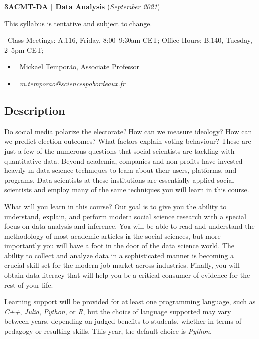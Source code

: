 \documentclass{article}
\begin{document}
\begin{center}
    {\Large\textbf{3ACMT-DA | Data Analysis} (\textit{September 2021})}

This syllabus is tentative and subject to change.

{\small
    \faClock~Class Meetings: A.116, Friday, 8:00--9:30am CET; Office Hours: B.140, Tuesday, 2--5pm CET;
}

\end{center}

\begin{itemize}
    \item \faUser~Mickael Temporão, Associate Professor
    \item \faEnvelope~\textit{m.temporao@sciencespobordeaux.fr}
\end{itemize}


\subsection*{Description}
Do social media polarize the electorate? How can we measure ideology? How can we predict election outcomes? What factors explain voting behaviour? These are just a few of the numerous questions that social scientists are tackling with quantitative data. Beyond academia, companies and non-profits have invested heavily in data science techniques to learn about their users, platforms, and programs. Data scientists at these institutions are essentially applied social scientists and employ many of the same techniques you will learn in this course.

What will you learn in this course?
Our goal is to give you the ability to understand, explain, and perform modern social science research with a special focus on data analysis and inference. You will be able to read and understand the methodology of most academic articles in the social sciences, but more importantly you will have a foot in the door of the data science world. The ability to collect and analyze data in a sophisticated manner is becoming a crucial skill set for the modern job market across industries. Finally, you will obtain data literacy that will help you be a critical consumer of evidence for the rest of your life.

Learning support will be provided for at least one programming language, such as \textit{C++}, \textit{Julia}, \textit{Python}, or \textit{R}, but the choice of language supported may vary between years, depending on judged benefits to students, whether in terms of pedagogy or resulting skills. This year, the default choice is \textit{Python}.
\end{document}
